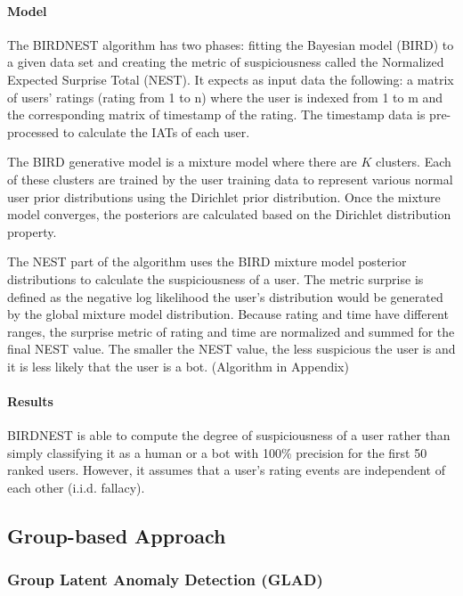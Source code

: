 \documentclass[11pt, oneside]{article}   	%
\begin{document}
\paragraph*{Model}
\quad

\quad The BIRDNEST algorithm has two phases: fitting the Bayesian model (BIRD) to a given data set and creating the metric of suspiciousness called the Normalized Expected Surprise Total (NEST).
It expects as input data the following: a matrix of users' ratings (rating from 1 to n) where the user is indexed from 1 to m and the corresponding matrix of timestamp of the rating.
The timestamp data is pre-processed to calculate the IATs of each user.

\quad The BIRD generative model is a mixture model where there are $K$ clusters.
Each of these clusters are trained by the user training data to represent various normal user prior distributions using the Dirichlet prior distribution.
Once the mixture model converges, the posteriors are calculated based on the Dirichlet distribution property.

\quad The NEST part of the algorithm uses the BIRD mixture model posterior distributions to calculate the suspiciousness of a user.
The metric surprise is defined as the negative log likelihood the user's distribution would be generated by the global mixture model distribution.
Because rating and time have different ranges, the surprise metric of rating and time are normalized and summed for the final NEST value.
The smaller the NEST value, the less suspicious the user is and it is less likely that the user is a bot. (Algorithm in Appendix)

\paragraph{Results}
\quad

\quad BIRDNEST is able to compute the degree of suspiciousness of a user rather than simply classifying it as a human or a bot with 100\% precision for the first 50 ranked users. However, it assumes that a user's rating events are independent of each other (i.i.d. fallacy).

\subsection{Group-based Approach}

\subsubsection{Group Latent Anomaly Detection (GLAD)}
\end{document}
